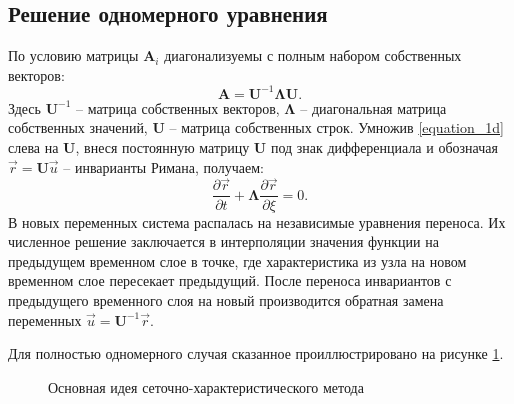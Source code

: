 \documentclass[a4paper]{article}
\numberwithin{equation}{section}
\begin{document}
\subsection{Решение одномерного уравнения}
По условию матрицы $\mathbf{A}_i$ диагонализуемы с полным набором собственных векторов:
\begin{equation}
	\label{diagonal_view}
	\mathbf{A} = \mathbf{U}^{-1}\mathbf{\Lambda}\mathbf{U}.
\end{equation}
Здесь $\mathbf{U}^{-1}$ -- матрица собственных векторов, 
$\mathbf{\Lambda}$ -- диагональная матрица собственных значений,
$\mathbf{U}$ -- матрица собственных строк.
Умножив \eqref{equation_1d} слева на $\mathbf{U}$, 
внеся постоянную матрицу $\mathbf{U}$ под знак дифференциала
и обозначая $\vec{r} = \mathbf{U}\vec{u}$ -- инварианты Римана, получаем:
\begin{equation}
	\label{in_riemann_invariants}
	\frac{\partial\vec{r}}{\partial{t}}+\mathbf{\Lambda}\frac{\partial\vec{r}}{\partial{\xi}} = 0.
\end{equation}
В новых переменных система распалась на независимые уравнения переноса.
Их численное решение заключается в интерполяции значения функции
на предыдущем временном слое в точке, где характеристика из узла 
на новом временном слое пересекает предыдущий. 
После переноса инвариантов с предыдущего временного слоя на новый
производится обратная замена переменных $\vec{u} = \mathbf{U}^{-1}\vec{r}$.

Для полностью одномерного случая 
сказанное проиллюстрировано на рисунке \ref{pic:gcm-idea}.
\begin{figure}[H]
	\caption{Основная идея сеточно-характеристического метода}
	\label{pic:gcm-idea}
\end{figure}
\end{document}
